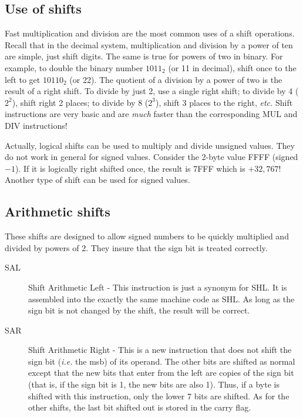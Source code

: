 \subsection{Use of shifts}

Fast multiplication and division are the most common uses of a shift
operations. Recall that in the decimal system, multiplication and
division by a power of ten are simple, just shift digits. The same is
true for powers of two in binary. For example, to double the binary
number $1011_2$ (or 11 in decimal), shift once to the left to get
$10110_2$ (or 22). The quotient of a division by a power of two is the
result of a right shift. To divide by just 2, use a single right
shift; to divide by 4 ($2^2$), shift right 2 places; to divide by 8
($2^3$), shift 3 places to the right, \emph{etc.} Shift instructions
are very basic and are \emph{much} faster than the corresponding
{\code MUL}  and {\code DIV}  instructions!

Actually, logical shifts can be used to multiply and divide unsigned
values. They do not work in general for signed values. Consider the
2-byte value FFFF (signed $-1$). If it is logically right shifted
once, the result is 7FFF which is $+32,767$! Another type of shift can
be used for signed values.  

\subsection{Arithmetic shifts}

These shifts are designed to allow signed numbers to be quickly multiplied
and divided by powers of 2. They insure that the sign bit is treated 
correctly.
\begin{description}
\item[SAL]  Shift Arithmetic Left - This instruction is just a synonym for
           {\code SHL}. It is assembled into the exactly the same machine
           code as {\code SHL}. As long as the sign bit is not changed by
           the shift, the result will be correct.
\item[SAR]  Shift Arithmetic Right - This is a new instruction that does
           not shift the sign bit (\emph{i.e.} the msb) of its operand. The
           other bits are shifted as normal except that the new bits that 
           enter from the left are copies of the sign bit (that is, if the 
           sign bit is 1, the new bits are also 1). Thus, if a byte is shifted
           with this instruction, only the lower 7 bits are shifted. As for
           the other shifts, the last bit shifted out is stored in the
           carry flag.
\end{description}

